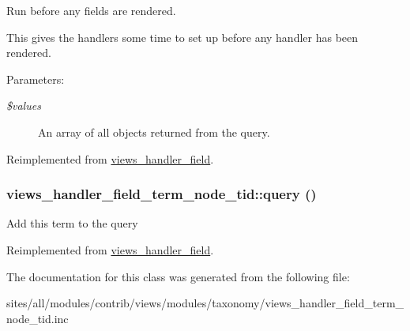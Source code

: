 Run before any fields are rendered.

This gives the handlers some time to set up before any handler has been rendered.

\begin{Desc}
\item[Parameters:]
\begin{description}
\item[{\em \$values}]An array of all objects returned from the query. \end{description}
\end{Desc}


Reimplemented from \hyperlink{classviews__handler__field_e30a1d9c98c62ae40c90b938e09cd0ec}{views\_\-handler\_\-field}.\hypertarget{classviews__handler__field__term__node__tid_8160a16d41604b141768dc313b6223b9}{
\subsubsection[{query}]{\setlength{\rightskip}{0pt plus 5cm}views\_\-handler\_\-field\_\-term\_\-node\_\-tid::query ()}}
\label{classviews__handler__field__term__node__tid_8160a16d41604b141768dc313b6223b9}


Add this term to the query 

Reimplemented from \hyperlink{classviews__handler__field_4f661f91bcbe80d4a00c30a31456c502}{views\_\-handler\_\-field}.

The documentation for this class was generated from the following file:\begin{CompactItemize}
\item 
sites/all/modules/contrib/views/modules/taxonomy/views\_\-handler\_\-field\_\-term\_\-node\_\-tid.inc\end{CompactItemize}
